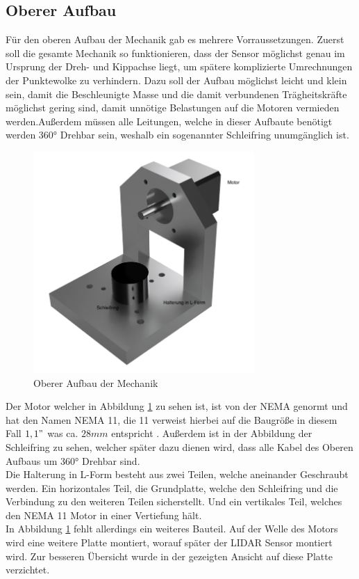 \subsection{Oberer Aufbau}
Für den oberen Aufbau der Mechanik gab es mehrere Vorraussetzungen. Zuerst soll die gesamte Mechanik so funktionieren, dass der Sensor möglichst genau im Ursprung der Dreh- und Kippachse liegt, um spätere komplizierte Umrechnungen der Punktewolke zu verhindern. Dazu soll der Aufbau möglichst leicht und klein sein, damit die Beschleunigte Masse und die damit verbundenen Trägheitskräfte möglichst gering sind, damit unnötige Belastungen auf die Motoren vermieden werden.Außerdem müssen alle Leitungen, welche in dieser Aufbaute benötigt werden 360° Drehbar sein, weshalb ein sogenannter Schleifring unumgänglich ist. 
\begin{figure}[H]
	\centering
	\includegraphics[width=0.75\textwidth]{images/Mechanik/ObererAufbau}
	\caption{Oberer Aufbau der Mechanik}
	\label{obereraufbau}
\end{figure}
Der Motor welcher in Abbildung \ref{obereraufbau} zu sehen ist, ist von der \ac{NEMA} genormt und hat den Namen \ac{NEMA} 11, die 11 verweist hierbei auf die Baugröße in diesem Fall $1,1"$ was ca. $28mm$ entspricht \cite{NEMA}. Außerdem ist in der Abbildung der Schleifring zu sehen, welcher später dazu dienen wird, dass alle Kabel des Oberen Aufbaus um 360° Drehbar sind. \\
Die Halterung in L-Form besteht aus zwei Teilen, welche aneinander Geschraubt werden. Ein horizontales Teil, die Grundplatte, welche den Schleifring und die Verbindung zu den weiteren Teilen sicherstellt. Und ein vertikales Teil, welches den \ac{NEMA} 11 Motor in einer Vertiefung hält.\\
In Abbildung \ref{obereraufbau} fehlt allerdings ein weiteres Bauteil. Auf der Welle des Motors wird eine weitere Platte montiert, worauf später der \ac{LIDAR} Sensor montiert wird. Zur besseren Übersicht wurde in der gezeigten Ansicht auf diese Platte verzichtet.
